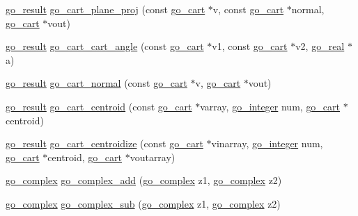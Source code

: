 \begin{DoxyCompactItemize}
\item 
\hyperlink{gotypes_8h_a55d48b38cd959f63c7e8db8337a9792a}{go\-\_\-result} \hyperlink{namespacegomotion_a8cbb71ceb17e1a4b1894cdcc784f1ad5}{go\-\_\-cart\-\_\-plane\-\_\-proj} (const \hyperlink{structgomotion_1_1go__cart}{go\-\_\-cart} $\ast$v, const \hyperlink{structgomotion_1_1go__cart}{go\-\_\-cart} $\ast$normal, \hyperlink{structgomotion_1_1go__cart}{go\-\_\-cart} $\ast$vout)
\item 
\hyperlink{gotypes_8h_a55d48b38cd959f63c7e8db8337a9792a}{go\-\_\-result} \hyperlink{namespacegomotion_a86e6cb45fa60161e2c4bf66cbde1db81}{go\-\_\-cart\-\_\-cart\-\_\-angle} (const \hyperlink{structgomotion_1_1go__cart}{go\-\_\-cart} $\ast$v1, const \hyperlink{structgomotion_1_1go__cart}{go\-\_\-cart} $\ast$v2, \hyperlink{gotypes_8h_afd666a2393eebd71ee455846ac9def9b}{go\-\_\-real} $\ast$a)
\item 
\hyperlink{gotypes_8h_a55d48b38cd959f63c7e8db8337a9792a}{go\-\_\-result} \hyperlink{namespacegomotion_a3fb48637adc447f5c57555e71c0b2fc6}{go\-\_\-cart\-\_\-normal} (const \hyperlink{structgomotion_1_1go__cart}{go\-\_\-cart} $\ast$v, \hyperlink{structgomotion_1_1go__cart}{go\-\_\-cart} $\ast$vout)
\item 
\hyperlink{gotypes_8h_a55d48b38cd959f63c7e8db8337a9792a}{go\-\_\-result} \hyperlink{namespacegomotion_a63a410189d7c9ab683eaf974e43c3129}{go\-\_\-cart\-\_\-centroid} (const \hyperlink{structgomotion_1_1go__cart}{go\-\_\-cart} $\ast$varray, \hyperlink{gotypes_8h_a7d30f606bb0f58ffe2b3bd71e5c8af5c}{go\-\_\-integer} num, \hyperlink{structgomotion_1_1go__cart}{go\-\_\-cart} $\ast$centroid)
\item 
\hyperlink{gotypes_8h_a55d48b38cd959f63c7e8db8337a9792a}{go\-\_\-result} \hyperlink{namespacegomotion_ae454fe1815fbe1762ffa012bf0c80f20}{go\-\_\-cart\-\_\-centroidize} (const \hyperlink{structgomotion_1_1go__cart}{go\-\_\-cart} $\ast$vinarray, \hyperlink{gotypes_8h_a7d30f606bb0f58ffe2b3bd71e5c8af5c}{go\-\_\-integer} num, \hyperlink{structgomotion_1_1go__cart}{go\-\_\-cart} $\ast$centroid, \hyperlink{structgomotion_1_1go__cart}{go\-\_\-cart} $\ast$voutarray)
\item 
\hyperlink{structgomotion_1_1go__complex}{go\-\_\-complex} \hyperlink{namespacegomotion_aba19101511a09bb95ed8ea329200e9fb}{go\-\_\-complex\-\_\-add} (\hyperlink{structgomotion_1_1go__complex}{go\-\_\-complex} z1, \hyperlink{structgomotion_1_1go__complex}{go\-\_\-complex} z2)
\item 
\hyperlink{structgomotion_1_1go__complex}{go\-\_\-complex} \hyperlink{namespacegomotion_a1141cb8b10a9d940b608b3d94a097a87}{go\-\_\-complex\-\_\-sub} (\hyperlink{structgomotion_1_1go__complex}{go\-\_\-complex} z1, \hyperlink{structgomotion_1_1go__complex}{go\-\_\-complex} z2)

\end{DoxyCompactItemize}
